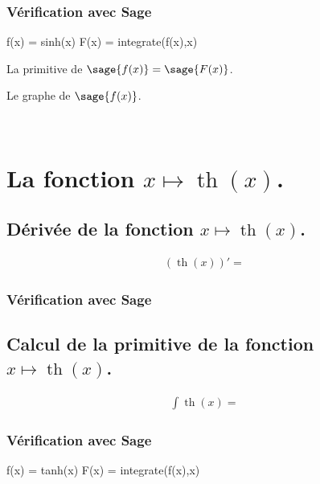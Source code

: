 \documentclass[a4paper,14pt]{extreport} %
\renewcommand{\tanh}{\mathop{\mathrm{th}}}
\begin{document}
\subsubsection{Vérification avec Sage}

\begin{sageblock}
    f(x) = sinh(x)
    F(x) = integrate(f(x),x)
\end{sageblock}


La primitive de $\sage{f(x)} = \sage{F(x)} $.

Le graphe de $\sage{f(x)} $.


\begin{center}
 \\
\end{center}




\section{La fonction  $x \mapsto \tanh(x)$.}

\subsection{Dérivée de la fonction $x \mapsto \tanh(x)$.}

\begin{align*}
(\tanh(x))' = &
\end{align*}


\subsubsection{Vérification avec Sage}


\subsection{Calcul de la primitive de la fonction  $x \mapsto \tanh(x)$.}


\begin{align*}
\int \tanh(x) =& 
\end{align*}


\subsubsection{Vérification avec Sage}


\begin{sageblock}
    f(x) = tanh(x)
    F(x) = integrate(f(x),x)
\end{sageblock}
\end{document}
